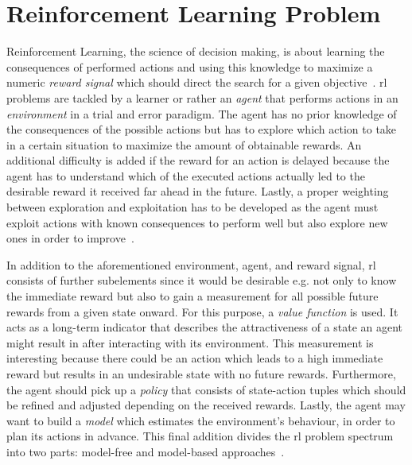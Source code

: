 \documentclass[draft,final]{vutinfth} %
\begin{document}
    \section{Reinforcement Learning Problem}\label{sec:reinforcement-learning-problem}
    Reinforcement Learning, the science of decision making, is about learning the consequences of performed actions and using this knowledge to maximize a numeric \textit{reward signal} which should direct the search for a given objective~\citep{sutton_reinforcement_2018}.
    \gls{rl} problems are tackled by a learner or rather an \textit{agent} that performs actions in an \textit{environment} in a trial and error paradigm.
    The agent has no prior knowledge of the consequences of the possible actions but has to explore which action to take in a certain situation to maximize the amount of obtainable rewards.
    An additional difficulty is added if the reward for an action is delayed because the agent has to understand which of the executed actions actually led to the desirable reward it received far ahead in the future.
    Lastly, a proper weighting between exploration and exploitation has to be developed as the agent must exploit actions with known consequences to perform well but also explore new ones in order to improve~\citep{kaelbling_reinforcement_1996}.

    In addition to the aforementioned environment, agent, and reward signal, \gls{rl} consists of further subelements since it would be desirable e.g. not only to know the immediate reward but also to gain a measurement for all possible future rewards from a given state onward.
    For this purpose, a \textit{value function} is used.
    It acts as a long-term indicator that describes the attractiveness of a state an agent might result in after interacting with its environment.
    This measurement is interesting because there could be an action which leads to a high immediate reward but results in an undesirable state with no future rewards.
    Furthermore, the agent should pick up a \textit{policy} that consists of state-action tuples which should be refined and adjusted depending on the received rewards.
    Lastly, the agent may want to build a \textit{model} which estimates the environment's behaviour, in order to plan its actions in advance.
    This final addition divides the \gls{rl} problem spectrum into two parts: model-free and model-based approaches~\citep{sutton_reinforcement_2018}.
\end{document}
